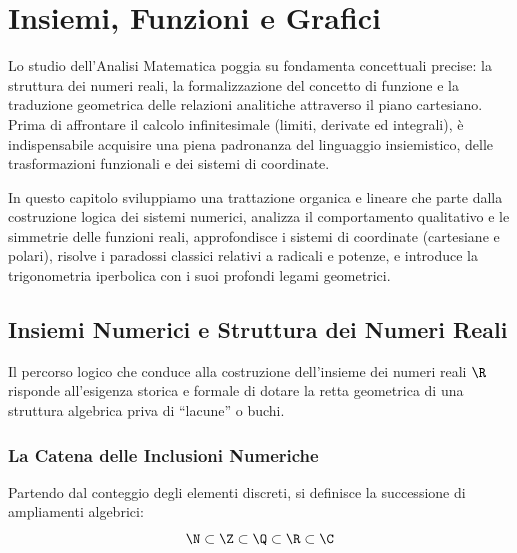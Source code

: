 \chapter{Insiemi, Funzioni e Grafici}
\label{chap:insiemi_funzioni}

Lo studio dell'Analisi Matematica poggia su fondamenta concettuali precise: la struttura dei numeri reali, la formalizzazione del concetto di funzione e la traduzione geometrica delle relazioni analitiche attraverso il piano cartesiano. Prima di affrontare il calcolo infinitesimale (limiti, derivate ed integrali), è indispensabile acquisire una piena padronanza del linguaggio insiemistico, delle trasformazioni funzionali e dei sistemi di coordinate.

In questo capitolo sviluppiamo una trattazione organica e lineare che parte dalla costruzione logica dei sistemi numerici, analizza il comportamento qualitativo e le simmetrie delle funzioni reali, approfondisce i sistemi di coordinate (cartesiane e polari), risolve i paradossi classici relativi a radicali e potenze, e introduce la trigonometria iperbolica con i suoi profondi legami geometrici.

\section{Insiemi Numerici e Struttura dei Numeri Reali}
\label{sec:insiemi_numerici}

Il percorso logico che conduce alla costruzione dell'insieme dei numeri reali $\R$ risponde all'esigenza storica e formale di dotare la retta geometrica di una struttura algebrica priva di ``lacune'' o buchi.

\subsection{La Catena delle Inclusioni Numeriche}
Partendo dal conteggio degli elementi discreti, si definisce la successione di ampliamenti algebrici:
\[
    \N \subset \Z \subset \Q \subset \R \subset \C
\]

